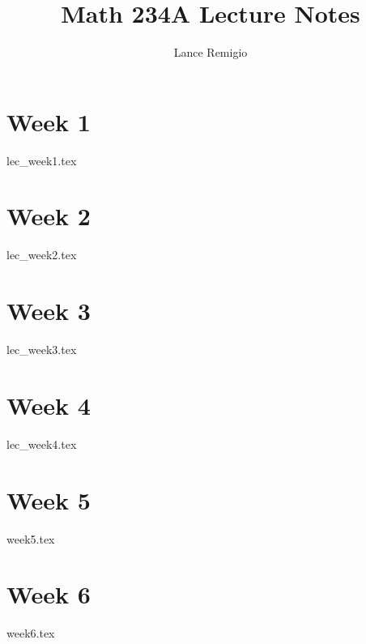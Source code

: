 \documentclass[a4paper]{report}
\title{Math 234A Lecture Notes}
\author{Lance Remigio}
\begin{document}
\maketitle    
\tableofcontents

\chapter{Week 1}

{lec_week1.tex}

\chapter{Week 2}

{lec_week2.tex}

\chapter{Week 3}

{lec_week3.tex}

\chapter{Week 4}

{lec_week4.tex}

\chapter{Week 5}

{week5.tex}

\chapter{Week 6}

{week6.tex}
\end{document}
